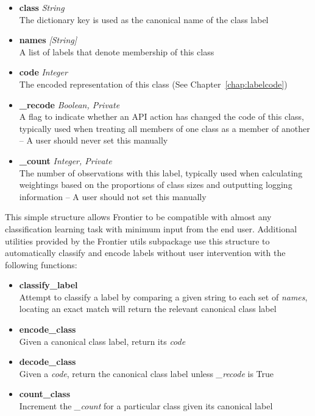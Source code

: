 \begin{itemize}
    \item \textbf{class} \textit{String}\hfill\\
        The dictionary key is used as the canonical name of the class label
    \item \textbf{names} \textit{[String]}\hfill\\
        A list of labels that denote membership of this class
    \item \textbf{code} \textit{Integer}\hfill\\
        The encoded representation of this class (See Chapter~\ref{chap:labelcode})
    \item \textbf{\_recode} \textit{Boolean, Private}\hfill\\
        A flag to indicate whether an API action has changed the code of this
        class, typically used when treating all members of one class as a member
        of another -- A user should never set this manually
    \item \textbf{\_count} \textit{Integer, Private}\hfill\\
        The number of observations with this label, typically used when
        calculating weightings based on the proportions of class sizes and
        outputting logging information -- A user should not set this manually
\end{itemize}

This simple structure allows Frontier to be compatible with almost any
classification learning task with minimum input from the end user. Additional
utilities provided by the Frontier utils subpackage use this structure to
automatically classify and encode labels without user intervention with the
following functions:

\begin{itemize}
    \item \textbf{classify\_label} \hfill\\
        Attempt to classify a label by comparing a given string to each set of
        \textit{names}, locating an exact match will return the relevant
        canonical class label
    \item \textbf{encode\_class} \hfill\\
        Given a canonical class label, return its \textit{code}
    \item \textbf{decode\_class} \hfill\\
        Given a \textit{code}, return the canonical class label unless
        \textit{\_recode} is True
    \item \textbf{count\_class} \hfill\\
        Increment the \textit{\_count} for a particular class given its
        canonical label
\end{itemize}

